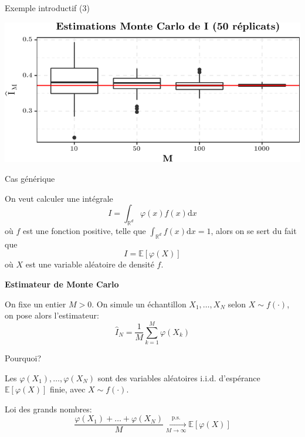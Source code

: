 \documentclass[ignorenonframetext,]{beamer}
\begin{document}
\begin{frame}{Exemple introductif (3)}
\protect\hypertarget{exemple-introductif-3}{}

\includegraphics{diapos_monte_carlo_files/figure-beamer/monte_carlo_estimate_ex1-1.pdf}

\end{frame}

\begin{frame}{Cas générique}
\protect\hypertarget{cas-guxe9nuxe9rique}{}

On veut calculer une intégrale
\[I = \int_{\mathbb{R}^d} \varphi(x) f(x) \text{d}x\] où \(f\) est une
fonction positive, telle que \(\int_{\mathbb{R}^d} f(x)\text{d}x = 1\),
alors on se sert du fait que \[
I = \mathbb{E}[\varphi(X)]
\] où \(X\) est une variable aléatoire de densité \(f\).

\textbf{Estimateur de Monte Carlo}

On fixe un entier \(M > 0\). On simule un échantillon \(X_1,\dots, X_N\)
selon \(X\sim f(\cdot)\), on pose alors l'estimateur:
\[\hat{I}_N = \frac{1}{M}\sum_{k= 1}^M \varphi(X_k)\]

\end{frame}

\begin{frame}{Pourquoi?}
\protect\hypertarget{pourquoi}{}

Les \(\varphi(X_1),\dots,\varphi(X_N)\) sont des variables aléatoires
i.i.d. d'espérance \(\mathbb{E}[\varphi(X)]\) finie, avec
\(X\sim f(\cdot)\). \pause

Loi des grands nombres:
\[\frac{\varphi(X_1) + \dots + \varphi(X_N)}{M} \underset{M\rightarrow\infty}{\overset{\text{p.s.}}{\longrightarrow}} \mathbb{E}[\varphi(X)]\]

\end{frame}
\end{document}
